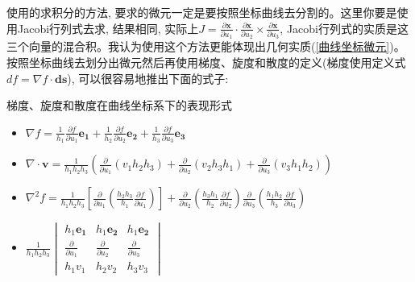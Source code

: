 使用的求积分的方法, 要求的微元一定是要按照坐标曲线去分割的。这里你要是使用Jacobi行列式去求, 结果相同, 实际上$J=\frac{\partial \bm{x}}{\partial u_1}\cdot
\frac{\partial \bm{x}}{\partial u_2}\times\frac{\partial \bm{x}}{\partial u_3}$, Jacobi行列式的实质是这三个向量的混合积。我认为使用这个方法更能体现出几何实质(\ref{曲线坐标微元})。
按照坐标曲线去划分出微元然后再使用梯度、旋度和散度的定义(梯度使用定义式$df=\nabla f \cdot \bm{ds}$), 可以很容易地推出下面的式子:
\begin{theorem}{梯度、旋度和散度在曲线坐标系下的表现形式}
    \begin{itemize}
        \item $\nabla f = \frac{1}{h_1}\frac{\partial f}{\partial u_1}\bm{e_1}+\frac{1}{h_2}\frac{\partial f}{\partial u_2}\bm{e_2}+\frac{1}{h_3}\frac{\partial f}{\partial u_3}\bm{e_3}$
        \item $\nabla \cdot \bm{v} = \frac{1}{h_1h_2h_3}\left(\frac{\partial}{\partial u_1}(v_1h_2h_3)+\frac{\partial}{\partial u_2}(v_2h_3h_1)+\frac{\partial}{\partial u_3}(v_3h_1h_2)\right)$
        \item $\nabla^2 f = \frac{1}{h_1h_2h_3}\left[\frac{\partial}{\partial u_1}\left(\frac{h_2h_3}{h_1}\frac{\partial f}{\partial u_1}\right)\right]
               +\frac{\partial}{\partial u_2}\left(\frac{h_3h_1}{h_2}\frac{\partial f}{\partial u_2}\right)
               \frac{\partial}{\partial u_3}\left(\frac{h_1h_2}{h_3}\frac{\partial f}{\partial u_3}\right)$
        \item 
        \begin{math}
            \displaystyle
            \frac{1}{h_1h_2h_3} 
            \begin{vmatrix}
            h_1\bm{e_1}&  h_1\bm{e_2} & h_1\bm{e_2} \\
            \frac{\partial }{\partial u_1} & \frac{\partial }{\partial u_2} & \frac{\partial }{\partial u_3}\\
            h_1v_1 & h_2v_2 & h_3v_3
            \end{vmatrix}
        \end{math}
    \end{itemize}
\end{theorem}
